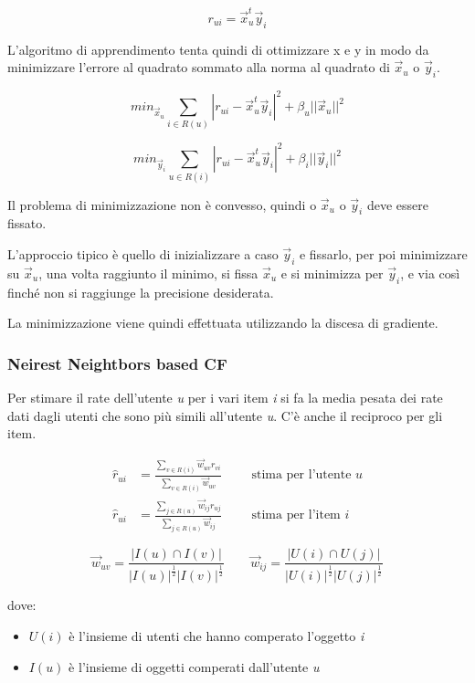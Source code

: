 $$
r_{ui} = \vec{x}_{u}^t\vec{y}_i
$$

L'algoritmo di apprendimento tenta quindi di ottimizzare x e y in modo
da minimizzare l'errore al quadrato sommato alla norma al quadrato di $\vec{x}_u$
o $\vec{y}_i$.

$$ 
min_{\vec{x}_u}\sum_{i \in R(u)} | r_{ui} - \vec{x}_{u}^t\vec{y}_i |^2 + \beta_u ||\vec{x}_u ||^2
$$

$$
min_{\vec{y}_i}\sum_{u \in R(i)} | r_{ui} - \vec{x}_{u}^t\vec{y}_i |^2 + \beta_i ||\vec{y}_i ||^2
$$

Il problema di minimizzazione non è convesso, quindi o $\vec{x}_u$ o  $\vec{y}_i$ deve
essere fissato.

L'approccio tipico è quello di inizializzare a caso  $\vec{y}_i$ e fissarlo, per
poi minimizzare su $\vec{x}_u$, una volta raggiunto il minimo, si fissa $\vec{x}_u$ e si
minimizza per $\vec{y}_i$, e via così finché non si raggiunge la precisione
desiderata.

La minimizzazione viene quindi effettuata utilizzando la discesa di gradiente.

\subsubsection{Neirest Neightbors based
CF}\label{neirest-neightbors-based-cf}

Per stimare il rate dell'utente \emph{u} per i vari item \textit{i} si fa la media pesata dei rate
dati dagli utenti che sono più simili all'utente \emph{u}. C'è anche il
reciproco per gli item.

\begin{align*}
\hat{r}_{ui} &= \frac{\sum_{v \in R(i)} \vec{w}_{uv} r_{vi}}{\sum_{v \in R(i)} \vec{w}_{uv}} \qquad \text{ stima per l'utente }  u \\
\hat{r}_{ui} &= \frac{\sum_{j \in R(u)} \vec{w}_{ij} r_{uj}}{\sum_{j \in R(u)} \vec{w}_{ij}} \qquad \text{ stima per l'item } i
\end{align*}

$$
\vec{w}_{uv} = \frac{|I(u) \cap I(v) |}{|I(u)|^{\frac{1}{2}} |I(v)|^{\frac{1}{2}} } \qquad \vec{w}_{ij} = \frac{|U(i) \cap U(j) |}{|U(i)|^{\frac{1}{2}} |U(j)|^{\frac{1}{2}} } 
$$

dove:

\begin{itemize}
	\item $U(i)$ è l'insieme di utenti che hanno comperato l'oggetto \textit{i}
	\item $I(u)$ è l'insieme di oggetti comperati dall'utente \textit{u}
\end{itemize}

